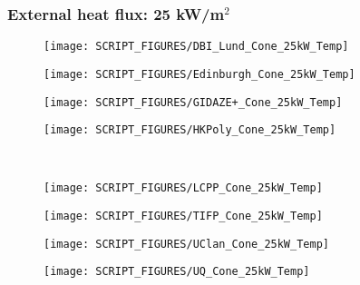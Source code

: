 \begin{landscape}
\subsubsection{External heat flux: 25 kW/m$^2$}
\begin{minipage}{0.65\textwidth}
\begin{figure}[H]
{\texttt{[image: SCRIPT\_FIGURES/DBI\_Lund\_Cone\_25kW\_Temp]}}\\
\end{figure}
\end{minipage}
\begin{minipage}{0.35\textwidth}
\begin{figure}[H]
{\texttt{[image: SCRIPT\_FIGURES/Edinburgh\_Cone\_25kW\_Temp]}}\\
\end{figure}
\end{minipage}
\vfill
\begin{minipage}{0.65\textwidth}
\begin{figure}[H]
{\texttt{[image: SCRIPT\_FIGURES/GIDAZE+\_Cone\_25kW\_Temp]}}\\
\end{figure}
\end{minipage}
\begin{minipage}{0.35\textwidth}
\begin{figure}[H]
{\texttt{[image: SCRIPT\_FIGURES/HKPoly\_Cone\_25kW\_Temp]}}\\
\end{figure}
\end{minipage}\\
\begin{minipage}{0.65\textwidth}
\begin{figure}[H]
{\texttt{[image: SCRIPT\_FIGURES/LCPP\_Cone\_25kW\_Temp]}}\\
\end{figure}
\end{minipage}
\begin{minipage}{0.35\textwidth}
\begin{figure}[H]
{\texttt{[image: SCRIPT\_FIGURES/TIFP\_Cone\_25kW\_Temp]}}\\
\end{figure}
\end{minipage}
\vfill

\begin{minipage}{0.65\textwidth}
\begin{figure}[H]
{\texttt{[image: SCRIPT\_FIGURES/UClan\_Cone\_25kW\_Temp]}}\\
\end{figure}
\end{minipage}
\begin{minipage}{0.35\textwidth}
\begin{figure}[H]
{\texttt{[image: SCRIPT\_FIGURES/UQ\_Cone\_25kW\_Temp]}}\\
\end{figure}
\end{minipage}
\vfill


\end{landscape}
